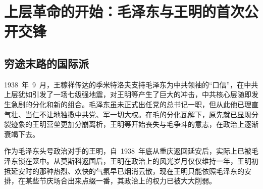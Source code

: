
\chapter{上层革命的开始：毛泽东与王明的首次公开交锋}

\section{穷途末路的国际派}

1938~年~9~月，王稼祥传达的季米特洛夫支持毛泽东为中共领袖的“口信”，在中共上层犹如引发了一场七级强地震，对王明等产生了巨大的冲击，中共核心层随即发生急剧的分化和新的组合。毛泽东虽未正式出任党的总书记一职，但从此他已理直气壮、当仁不让地独揽中共党、军一切大权。在毛的分化瓦解下，原先就已显现分裂迹象的王明营垒更加分崩离析，王明等开始丧失与毛争斗的意志，在政治上逐渐衰竭下去。

作为毛泽东头号政治对手的王明，自~1938~年底从重庆返回延安后，实际上已被毛泽东锁在笼中。从莫斯科返国后，王明在政治上的风光岁月仅仅维持一年，王明初抵延安时的那种热烈、欢快的气氛早已烟消云散，现在王明只能依照毛泽东的安排，在某些节庆场合出来点缀一番，其政治上的权力已被大大削弱。

